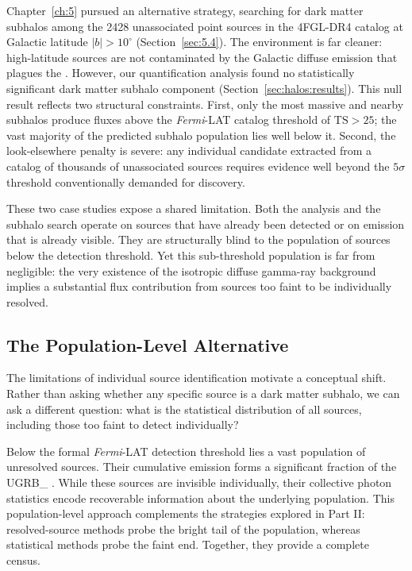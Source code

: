 Chapter~\ref{ch:5} pursued an alternative strategy, searching for dark matter subhalos among the 2428 unassociated point sources in the 4FGL-DR4 catalog \cite{Fermi-LAT:2022byn,Ballet:2023qzs} at Galactic latitude $|b| > 10^\circ$ (Section~\ref{sec:5.4}).
The environment is far cleaner: high-latitude sources are not contaminated by the Galactic diffuse emission that plagues the \GCE.
However, our quantification analysis found no statistically significant dark matter subhalo component (Section~\ref{sec:halos:results}).
This null result reflects two structural constraints.
First, only the most massive and nearby subhalos produce fluxes above the \textit{Fermi}-LAT catalog threshold of $\mathrm{TS} > 25$; the vast majority of the predicted subhalo population \cite{Springel:2008cc} lies well below it.
Second, the look-elsewhere penalty is severe: any individual candidate extracted from a catalog of thousands of unassociated sources requires evidence well beyond the $5\sigma$ threshold conventionally demanded for discovery.

These two case studies expose a shared limitation.
Both the \GCE analysis and the subhalo search operate on sources that have already been detected or on emission that is already visible.
They are structurally blind to the population of sources below the detection threshold.
Yet this sub-threshold population is far from negligible: the very existence of the isotropic diffuse gamma-ray background \cite{Fermi-LAT:2014ryh} implies a substantial flux contribution from sources too faint to be individually resolved.

\subsection{The Population-Level Alternative}
\label{sec:6.1.2}

The limitations of individual source identification motivate a conceptual shift.
Rather than asking whether any specific source is a dark matter subhalo, we can ask a different question: what is the statistical distribution of all sources, including those too faint to detect individually?

Below the formal \textit{Fermi}-LAT detection threshold lies a vast population of unresolved sources.
Their cumulative emission forms a significant fraction of the \gls{UGRB_} \cite{DGRB-review,Fermi-LAT:2014ryh}.
While these sources are invisible individually, their collective photon statistics encode recoverable information about the underlying population.
This population-level approach complements the strategies explored in Part II: resolved-source methods probe the bright tail of the population, whereas statistical methods probe the faint end.
Together, they provide a complete census.


